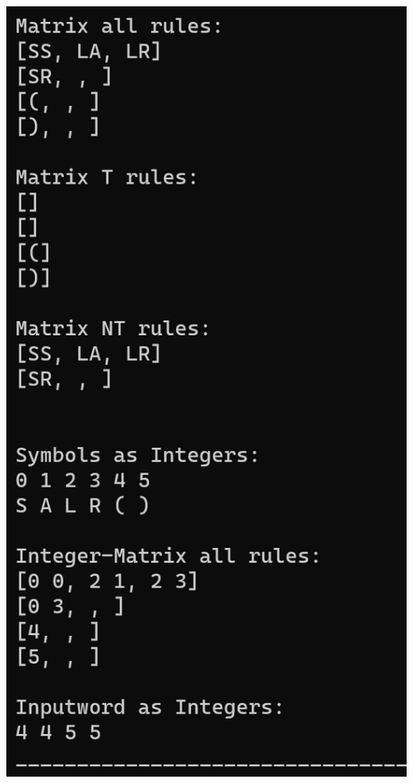 \documentclass[a4paper, 11pt]{article}
\begin{document}
\begin{minipage}{0.6\textwidth}
\end{minipage}\begin{minipage}{0.1\textwidth}
\ 
\end{minipage}\begin{minipage}{0.3\textwidth}
\includegraphics[scale=0.7]{images/terminal_1.png}
\end{minipage}
\end{document}
